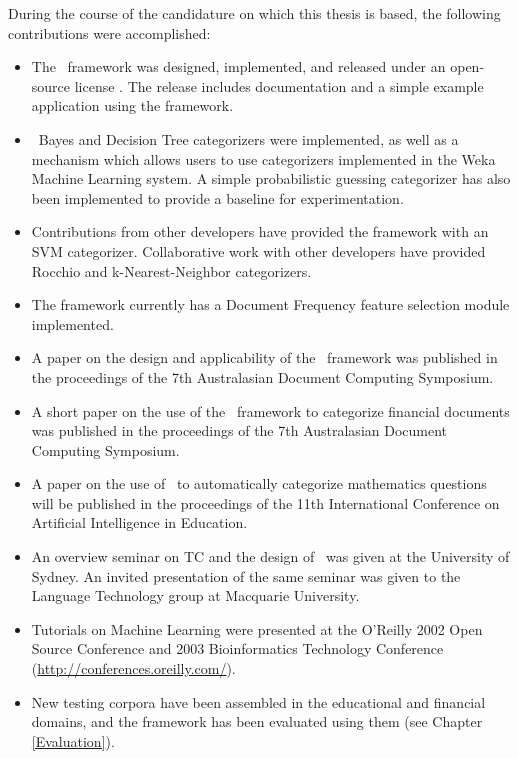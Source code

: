 During the course of the candidature on which this thesis is based,
the following contributions were accomplished:

\begin{itemize}
\item The \aicat\ framework was designed, implemented, and released
  under an open-source license \cite{cpan}.  The release includes
  documentation and a simple example application using the framework.
\item \naive\ Bayes and Decision Tree categorizers were implemented,
  as well as a mechanism which allows users to use categorizers
  implemented in the Weka Machine Learning system\cite{weka:99}.  A
  simple probabilistic guessing categorizer has also been implemented
  to provide a baseline for experimentation.
\item Contributions from other developers have provided the framework
  with an SVM categorizer.  Collaborative work with other developers
  have provided Rocchio and k-Nearest-Neighbor categorizers.
\item The framework currently has a Document Frequency feature
  selection module implemented.
\item A paper on the design and applicability of the \aicat\ framework
  was published in the proceedings of the 7th Australasian Document
  Computing Symposium. \cite{williams:02}
\item A short paper on the use of the \aicat\ framework to categorize
  financial documents was published in the proceedings of the
  7th Australasian Document Computing Symposium. \cite{calvo:02}
\item A paper on the use of \aicat\ to automatically categorize
  mathematics questions will be published in the
  proceedings of the 11th International Conference on Artificial Intelligence in
  Education.  \cite{williams:03}
\item An overview seminar on TC and the design of \aicat\ was given at
  the University of Sydney.  An invited presentation of the same
  seminar was given to the Language Technology group at Macquarie
  University.
\item Tutorials on Machine Learning were presented at the O'Reilly
  2002 Open Source Conference and 2003 Bioinformatics Technology
  Conference (\url{http://conferences.oreilly.com/}).
\item New testing corpora have been assembled in the educational and
  financial domains, and the framework has been evaluated using them
  (see Chapter \ref{Evaluation}).
\end{itemize}

